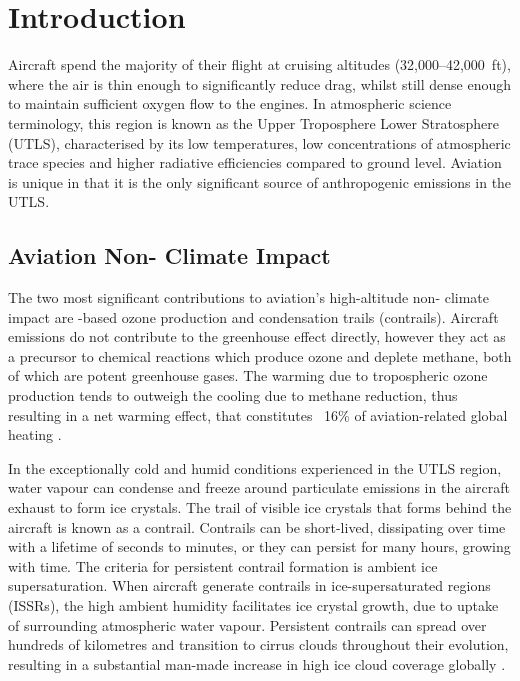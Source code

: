 \section{Introduction}
\label{Intro}

Aircraft spend the majority of their flight at cruising altitudes (32,000--42,000~ft), where the air is thin enough to significantly reduce drag, whilst still dense enough to maintain sufficient oxygen flow to the engines. In atmospheric science terminology, this region is known as the Upper Troposphere Lower Stratosphere (UTLS), characterised by its low temperatures, low concentrations of atmospheric trace species and higher radiative efficiencies compared to ground level. Aviation is unique in that it is the only significant source of anthropogenic emissions in the UTLS.

\subsection{Aviation Non- Climate Impact}
The two most significant contributions to aviation's high-altitude non- climate impact are -based ozone production and condensation trails (contrails). Aircraft  emissions do not contribute to the greenhouse effect directly, however they act as a precursor to chemical reactions which produce ozone and deplete methane, both of which are potent greenhouse gases. The warming due to tropospheric ozone production tends to outweigh the cooling due to methane reduction, thus resulting in a net warming effect, that constitutes ~16\% of aviation-related global heating \cite{Lee2021}.

In the exceptionally cold and humid conditions experienced in the UTLS region, water vapour can condense and freeze around particulate emissions in the aircraft exhaust to form ice crystals. The trail of visible ice crystals that forms behind the aircraft is known as a contrail. Contrails can be short-lived, dissipating over time with a lifetime of seconds to minutes, or they can persist for many hours, growing with time. The criteria for persistent contrail formation is ambient ice supersaturation. When aircraft generate contrails in ice-supersaturated regions (ISSRs), the high ambient humidity facilitates ice crystal growth, due to uptake of surrounding atmospheric water vapour. Persistent contrails can spread over hundreds of kilometres and transition to cirrus clouds throughout their evolution, resulting in a substantial man-made increase in high ice cloud coverage globally \cite{Karcher2018, Schumann2017}.

